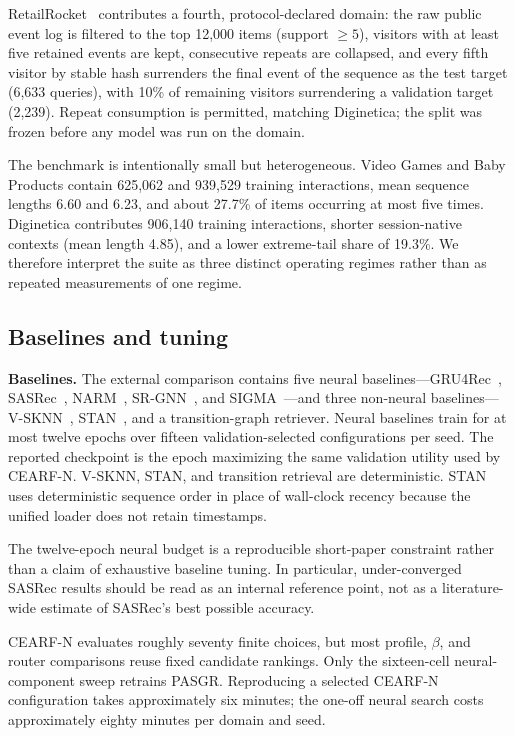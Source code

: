\documentclass[runningheads]{llncs}
\newcommand{\method}{CEARF-N}
\begin{document}
\label{sec:retail-protocol}
RetailRocket~\cite{rrkaggle} contributes a fourth, protocol-declared domain:
the raw public event log is filtered to the top 12{,}000 items (support
$\geq 5$), visitors with at least five retained events are kept, consecutive
repeats are collapsed, and every fifth visitor by stable hash surrenders the
final event of the sequence as the test target (6,633 queries), with 10\% of
remaining visitors surrendering a validation target (2,239).  Repeat
consumption is permitted, matching Diginetica; the split was frozen before
any model was run on the domain.

The benchmark is intentionally small but heterogeneous. Video Games and Baby
Products contain 625,062 and 939,529 training interactions, mean sequence
lengths 6.60 and 6.23, and about 27.7\% of items occurring at most five
times. Diginetica contributes 906,140 training interactions, shorter
session-native contexts (mean length 4.85), and a lower extreme-tail share of
19.3\%. We therefore interpret the suite as three distinct operating regimes
rather than as repeated measurements of one regime.

\subsection{Baselines and tuning}
\textbf{Baselines.} The external comparison contains five neural
baselines---GRU4Rec~\cite{hidasi2016gru4rec},
SASRec~\cite{kang2018sasrec}, NARM~\cite{li2017narm},
SR-GNN~\cite{wu2019srgnn}, and SIGMA~\cite{sigma2025}---and three non-neural
baselines---V-SKNN~\cite{ludewig2019performance}, STAN~\cite{garg2019stan}, and
a transition-graph retriever. Neural baselines train for at most twelve epochs
over fifteen validation-selected configurations per seed. The reported
checkpoint is the epoch maximizing the same validation utility used by
\method{}. V-SKNN, STAN, and transition retrieval are deterministic. STAN uses
deterministic sequence order in place of wall-clock recency because the unified
loader does not retain timestamps.

The twelve-epoch neural budget is a reproducible short-paper constraint rather
than a claim of exhaustive baseline tuning. In particular, under-converged
SASRec results should be read as an internal reference point, not as a
literature-wide estimate of SASRec's best possible accuracy.

\method{} evaluates roughly seventy finite choices, but most profile, $\beta$,
and router comparisons reuse fixed candidate rankings. Only the sixteen-cell
neural-component sweep retrains PASGR. Reproducing a selected \method{}
configuration takes approximately six minutes; the one-off neural search costs
approximately eighty minutes per domain and seed.
\end{document}
